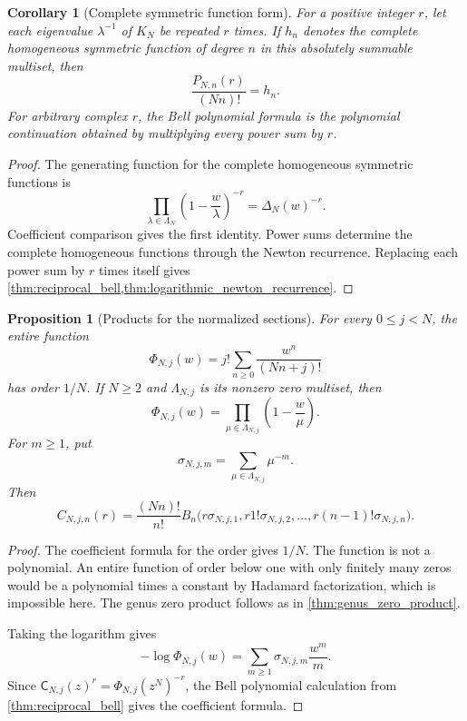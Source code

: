 \documentclass[11pt]{article}
\newtheorem{proposition}[proposition]{Proposition}
\newtheorem{corollary}[corollary]{Corollary}
\theoremstyle{definition}
\theoremstyle{remark}
\newcommand{\Cfun}{\mathsf C}
\begin{document}
\begin{corollary}[Complete symmetric function form]\label{cor:complete_symmetric_form}
For a positive integer $r$, let each eigenvalue $\lambda^{-1}$ of $K_N$ be repeated $r$ times.  If $h_n$ denotes the complete homogeneous symmetric function of degree $n$ in this absolutely summable multiset, then
\[
\frac{P_{N,n}(r)}{(Nn)!}=h_n.
\]
For arbitrary complex $r$, the Bell polynomial formula is the polynomial continuation obtained by multiplying every power sum by $r$.
\end{corollary}

\begin{proof}
The generating function for the complete homogeneous symmetric functions is
\[
\prod_{\lambda\in\Lambda_N}
\left(1-\frac w\lambda\right)^{-r}
=
\Delta_N(w)^{-r}.
\]
Coefficient comparison gives the first identity.  Power sums determine the complete homogeneous functions through the Newton recurrence.  Replacing each power sum by $r$ times itself gives \cref{thm:reciprocal_bell,thm:logarithmic_newton_recurrence}.
\end{proof}


\begin{proposition}[Products for the normalized sections]\label{prop:normalized_section_product}
For every $0\leq j<N$, the entire function
\[
\Phi_{N,j}(w)
=
j!\sum_{n\geq0}\frac{w^n}{(Nn+j)!}
\]
has order $1/N$.  If $N\geq2$ and $\Lambda_{N,j}$ is its nonzero zero multiset, then
\[
\Phi_{N,j}(w)
=
\prod_{\mu\in\Lambda_{N,j}}
\left(1-\frac w\mu\right).
\]
For $m\geq1$, put
\[
\sigma_{N,j,m}
=
\sum_{\mu\in\Lambda_{N,j}}\mu^{-m}.
\]
Then
\[
C_{N,j,n}(r)
=
\frac{(Nn)!}{n!}
B_n\bigl(
 r\sigma_{N,j,1},
 r1!\sigma_{N,j,2},
 \ldots,
 r(n-1)!\sigma_{N,j,n}
\bigr).
\]
\end{proposition}

\begin{proof}
The coefficient formula for the order gives $1/N$.  The function is not a polynomial.  An entire function of order below one with only finitely many zeros would be a polynomial times a constant by Hadamard factorization, which is impossible here.  The genus zero product follows as in \cref{thm:genus_zero_product}.

Taking the logarithm gives
\[
-\log\Phi_{N,j}(w)
=
\sum_{m\geq1}\sigma_{N,j,m}\frac{w^m}{m}.
\]
Since $\Cfun_{N,j}(z)^r=\Phi_{N,j}(z^N)^{-r}$, the Bell polynomial calculation from \cref{thm:reciprocal_bell} gives the coefficient formula.
\end{proof}
\end{document}
